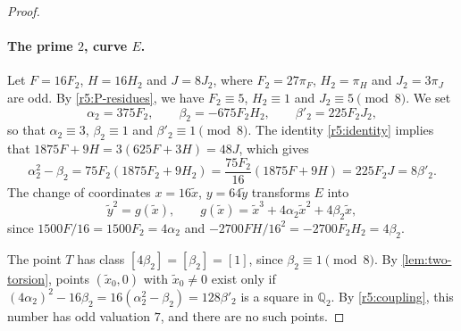 \documentclass[12pt,oneside,openany]{book}
\theoremstyle{definition}
\theoremstyle{plain}
\numberwithin{equation}{chapter}
\theoremstyle{plain}
\theoremstyle{definition}
\theoremstyle{remark}
\newcommand{\Q}{\mathbb Q}
\newcommand{\sq}[1]{[#1]}
\begin{document}
\begin{proof}
\paragraph{The prime $2$, curve $E$.} Let $F=16F_2$, $H=16H_2$ and $J=8J_2$, where $F_2=27\pi_F$, $H_2=\pi_H$ and $J_2=3\pi_J$ are odd. By \eqref{r5:P-residues}, we have $F_2\equiv5$, $H_2\equiv1$ and $J_2\equiv5\pmod8$. We set
\[
\alpha_2=375F_2,\qquad\beta_2=-675F_2H_2,\qquad\beta'_2=225F_2J_2,
\]
so that $\alpha_2\equiv3$, $\beta_2\equiv1$ and $\beta'_2\equiv1\pmod8$. The identity \eqref{r5:identity} implies that $1875F+9H=3(625F+3H)=48J$, which gives
\begin{equation}\label{r5:coupling}
\alpha_2^2-\beta_2=75F_2(1875F_2+9H_2)=\frac{75F_2}{16}(1875F+9H)=225F_2J=8\beta'_2.
\end{equation}
The change of coordinates $x=16\tilde x$, $y=64\tilde y$ transforms $E$ into
\[
\tilde y^2=g(\tilde x),\qquad g(\tilde x)=\tilde x^3+4\alpha_2 \tilde x^2+4\beta_2 \tilde x,
\]
since $1500F/16=1500F_2=4\alpha_2$ and $-2700FH/16^2=-2700F_2H_2=4\beta_2$.

The point $T$ has class $\sq{4\beta_2}=\sq{\beta_2}=\sq1$, since $\beta_2\equiv1\pmod8$. By \cref{lem:two-torsion}, points $(\tilde x_0,0)$ with $\tilde x_0\ne0$ exist only if $(4\alpha_2)^2-16\beta_2=16(\alpha_2^2-\beta_2)=128\beta'_2$ is a square in $\Q_2$. By \eqref{r5:coupling}, this number has odd valuation $7$, and there are no such points.


\end{proof}
\end{document}
